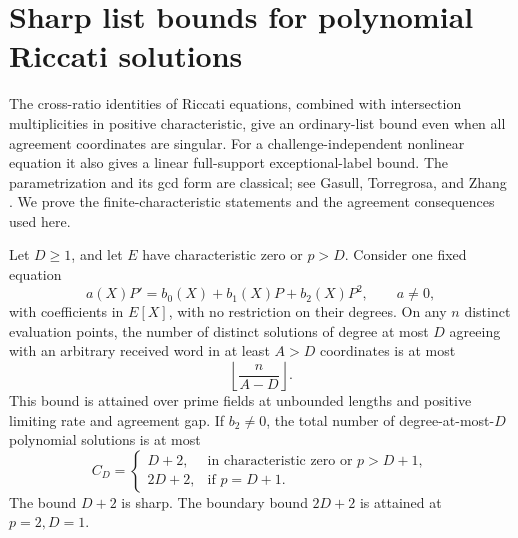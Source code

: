 \section{Sharp list bounds for polynomial Riccati solutions}
\label{app:riccati-cross-ratio}

The cross-ratio identities of Riccati equations, combined with
intersection multiplicities in positive characteristic, give an
ordinary-list bound even when all agreement coordinates are singular.
For a challenge-independent nonlinear equation it also gives a linear
full-support exceptional-label bound. The parametrization and its gcd
form are classical; see Gasull, Torregrosa, and Zhang
\cite[Lemmas 6--7]{gasull-riccati}. We prove the finite-characteristic
statements and the agreement consequences used here.

\begin{theorem}
\label{thm:riccati-cross-ratio}
Let $D\ge1$, and let $E$ have characteristic zero or $p>D$.
Consider one fixed equation
\begin{equation}
 a(X)P'=b_0(X)+b_1(X)P+b_2(X)P^2,\qquad a\ne0,
 \label{eq:fixed-riccati}
\end{equation}
with coefficients in $E[X]$, with no restriction on their degrees.
On any $n$ distinct evaluation points, the number of distinct solutions
of degree at most $D$ agreeing with an arbitrary received word in at
least $A>D$ coordinates is at most
\begin{equation}
 \left\lfloor\frac{n}{A-D}\right\rfloor.
 \label{eq:riccati-list}
\end{equation}
This bound is attained over prime fields at unbounded lengths and
positive limiting rate and agreement gap. If $b_2\ne0$, the total
number of degree-at-most-$D$ polynomial solutions is at most
\begin{equation}\label{eq:riccati-total-count}
 C_D=\begin{cases}
 D+2,&\text{in characteristic zero or }p>D+1,\\
 2D+2,&\text{if }p=D+1.
 \end{cases}
\end{equation}
The bound $D+2$ is sharp. The boundary bound $2D+2$ is attained
at $p=2,D=1$.
\end{theorem}
